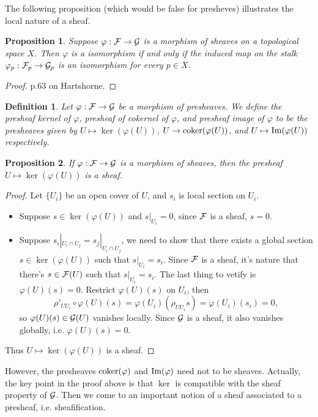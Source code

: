 \documentclass[8pt]{article}
\theoremstyle{plain}
\newtheorem{pro}{Proposition}
\newtheorem{defi}{Definition}
\begin{document}
The following proposition (which would be false for presheves) illustrates the local nature of a sheaf.
\begin{pro}
	Suppose $\varphi:\mathcal{F}\to\mathcal{G}$ is a morphism of sheaves on a topological space $X$. Then $\varphi$ is a isomorphism if and only if the induced map on the stalk $\varphi_p:\mathcal{F}_p\to \mathcal{G}_p$ is an isomorphism for every $p\in X$.
	\label{pro:1}
\end{pro}
\begin{proof}
	p.63 on Hartshorne.
\end{proof}
\begin{defi}
	Let $\varphi:\mathcal{F}\to\mathcal{G}$ be a morphism of presheaves. We define the presheaf kernel of $\varphi$, presheaf of cokernel of $\varphi$, and presheaf image of $\varphi$ to be the presheaves given by $U\mapsto \ker(\varphi(U))$, $U\to \operatorname{coker}(\varphi(U))$, and $U\mapsto \operatorname{Im}(\varphi(U))$ respectively.
\end{defi}
\begin{pro}
If $\varphi:\mathcal{F}\to\mathcal{G}$ is a morphism of sheaves, then the presheaf $U\mapsto \ker(\varphi(U))$ is a sheaf.
\end{pro}
\begin{proof}
	Let $\{U_i\}$ be an open cover of $U$, and $s_i$ is local section on $U_i$. 

	\begin{itemize}
		\item Suppose $s\in \ker(\varphi(U))$ and $s|_{U_i}=0$, since $\mathcal{F}$ is a sheaf, $s=0$.

		\item Suppose $s_i|_{U_i\cap U_j}=s_j|_{U_i\cap U_j}$, we need to show that there exists a global section $s\in \ker(\varphi(U))$ such that $s|_{U_i}=s_i$. Since $\mathcal{F}$ is a sheaf, it's nature that there's $s\in \mathcal{F}(U)$ such that $s|_{U_i}=s_i$. The last thing to vetify is $\varphi(U)(s)=0$. Restrict $\varphi(U)(s)$ on $U_i$, then
		\[
			\rho'_{UU_i}\circ \varphi(U)(s)=\varphi(U_i)(\rho_{UU_i}s)=\varphi(U_i)(s_i)=0,
		\]
		so $\varphi(U)(s)\in \mathcal{G}(U)$ vanishes locally. Since $\mathcal{G}$ is a sheaf, it also 	vanishes globally, i.e. $\varphi(U)(s)=0$.
	\end{itemize}
	Thus $U\mapsto \ker(\varphi(U))$ is a sheaf.
\end{proof}
However, the presheaves $\operatorname{coker}(\varphi)$ and $\operatorname{Im}(\varphi)$ need not to be sheaves. Actually, the key point in the proof above is that $\ker$ is compatible with the sheaf property of $\mathcal{G}$. Then we come to an important notion of a sheaf associated to a presheaf, i.e. sheafification.
\end{document}
